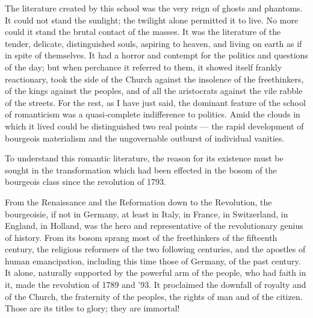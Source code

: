 \documentclass[12pt]{report}
\begin{document}
The literature created by this school was the very reign of ghosts and phantoms. It could not stand the sunlight; the twilight alone permitted it to live. No more could it stand the brutal contact of the masses. It was the literature of the tender, delicate, distinguished souls, aspiring to heaven, and living on earth as if in spite of themselves. It had a horror and contempt for the politics and questions of the day; but when perchance it referred to them, it showed itself frankly reactionary, took the side of the Church against the insolence of the freethinkers, of the kings against the peoples, and of all the aristocrats against the vile rabble of the streets. For the rest, as I have just said, the dominant feature of the school of romanticism was a quasi-complete indifference to politics. Amid the clouds in which it lived could be distinguished two real points — the rapid development of bourgeois materialism and the ungovernable outburst of individual vanities.


To understand this romantic literature, the reason for its existence must be sought in the transformation which had been effected in the bosom of the bourgeois class since the revolution of 1793.


From the Renaissance and the Reformation down to the Revolution, the bourgeoisie, if not in Germany, at least in Italy, in France, in Switzerland, in England, in Holland, was the hero and representative of the revolutionary genius of history. From its bosom sprang most of the freethinkers of the fifteenth century, the religious reformers of the two following centuries, and the apostles of human emancipation, including this time those of Germany, of the past century. It alone, naturally supported by the powerful arm of the people, who had faith in it, made the revolution of 1789 and ’93. It proclaimed the downfall of royalty and of the Church, the fraternity of the peoples, the rights of man and of the citizen. Those are its titles to glory; they are immortal!
\end{document}
